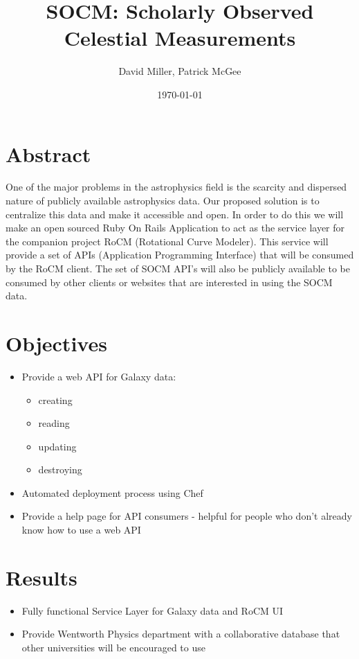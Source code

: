 \documentclass[12pt]{article}
\title{SOCM: Scholarly Observed Celestial Measurements}
\author{David Miller, Patrick McGee}
\date{\today}
\begin{document}
\maketitle

\section{Abstract}
One of the major problems in the astrophysics field is the scarcity and dispersed nature of publicly available astrophysics data. Our proposed solution is to centralize this data and make it accessible and open. In order to do this we will make an open sourced Ruby On Rails Application to act as the service layer for the companion project RoCM (Rotational Curve Modeler). This service will provide a set of APIs (Application Programming Interface) that will be consumed by the RoCM client. The set of SOCM API's will also be publicly available to be consumed by other clients or websites that are interested in using the SOCM data.

\section{Objectives}

\begin{itemize}
    \item{Provide a web API for Galaxy data:}
    \begin{itemize}
      \item{creating}
      \item{reading}
      \item{updating}
      \item{destroying}
    \end{itemize}
	\item Automated deployment process using Chef
	\item Provide a help page for API consumers - helpful for people who don't already know how to use a web API
\end{itemize}	

\section{Results}
\begin{itemize}
	\item{Fully functional Service Layer for Galaxy data and RoCM UI}
    \item{Provide Wentworth Physics department with a collaborative database that other universities will be encouraged to use}
\end{itemize}
\end{document}
